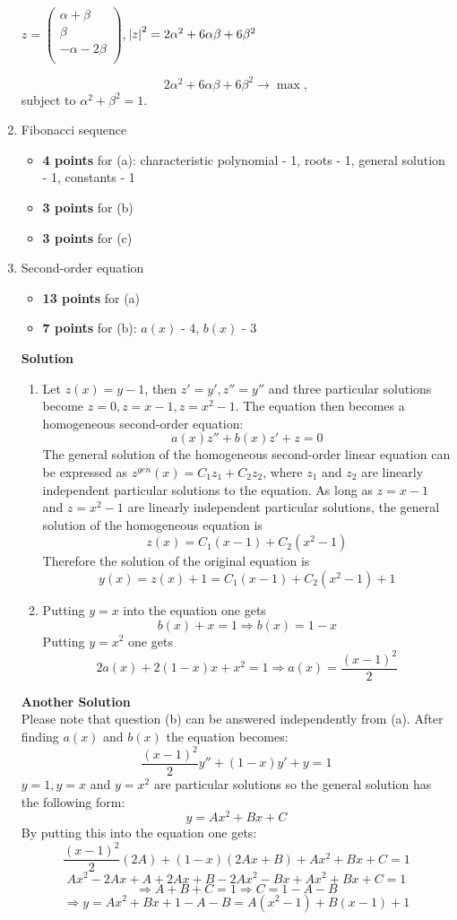 \documentclass[12pt]{article} %
\theoremstyle{definition} %
\begin{document}
\begin{enumerate}
$z = \begin{pmatrix}
  \alpha + \beta \\
  \beta \\
  -\alpha - 2\beta \\
\end{pmatrix}$, $\abs{z}^2 = 2\alpha^2 + 6\alpha\beta + 6\beta^2$

\[
  2\alpha^2 + 6\alpha\beta + 6\beta^2 \to \max,
\]
subject to $\alpha^2 + \beta^2 = 1$. 


\item Fibonacci sequence
\begin{itemize}
    \item \textbf{4 points} for (a): characteristic polynomial - 1, roots - 1, general solution - 1, constants - 1
    \item \textbf{3 points} for (b)
    \item \textbf{3 points} for (c)
\end{itemize}

\item Second-order equation
\begin{itemize}
    \item \textbf{13 points} for (a)
    \item \textbf{7 points} for (b): $a(x)$ - 4, $b(x)$ - 3
\end{itemize}

\textbf{Solution} \\
\begin{enumerate}
\item Let $z(x)=y-1$, then $z'=y', z''=y''$ and three particular solutions become $z=0, z=x-1, z=x^2-1$. The equation then becomes a homogeneous second-order equation:
\[
a(x)z''+b(x)z'+z=0
\]
The general solution of the homogeneous second-order linear equation can be expressed as $z^{gen}(x) = C_1z_1+C_2z_2$, where $z_1$ and $z_2$ are linearly independent particular solutions to the equation. As long as $z=x-1$ and $z=x^2-1$ are linearly independent particular solutions, the general solution of the homogeneous equation is
\[z(x) = C_1(x-1)+C_2(x^2-1)\]
Therefore the solution of the original equation is
\[
y(x) = z(x) + 1 = C_1(x-1)+C_2(x^2-1)+1
\]
\item Putting $y=x$ into the equation one gets
\[b(x) + x = 1 \Longrightarrow b(x) = 1-x\]
Putting $y=x^2$ one gets
\[2a(x) + 2(1-x)x + x^2 = 1 \Longrightarrow a(x) = \frac{(x-1)^2}{2}\]
\end{enumerate}


\textbf{Another Solution} \\
Please note that question (b) can be answered independently from (a).
After finding $a(x)$ and $b(x)$ the equation becomes:
\[
\frac {(x-1)^2}{2} y'' + (1-x)y' + y=1
\]
$y=1,y=x$ and $y=x^2$ are particular solutions so the general solution has the following form:
\[y=Ax^2+Bx+C\]
By putting this into the equation one gets:
\[
\frac {(x-1)^2}{2} (2A) + (1-x)(2Ax+B) + Ax^2+Bx+C=1
\]
\[ Ax^2-2Ax+A+2Ax+B-2Ax^2-Bx+Ax^2+Bx+C=1 \]
\[ \Longrightarrow A+B+C=1 \Longrightarrow C=1-A-B \]
\[
\Longrightarrow y = Ax^2+Bx+1-A-B=A(x^2-1)+B(x-1)+1
\]



\end{enumerate}
\end{document}
